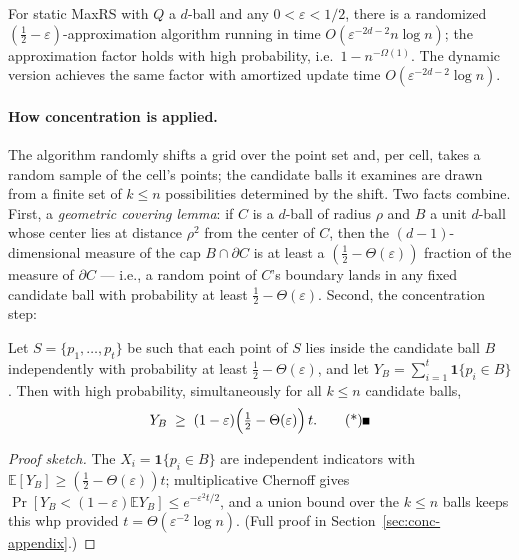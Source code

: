 \begin{theorem}\label{thm:conc-maxrs}
For static MaxRS with $Q$ a $d$-ball and any $0 < \varepsilon < 1/2$, there is a
randomized $(\tfrac12-\varepsilon)$-approximation algorithm running in time
$O(\varepsilon^{-2d-2} n \log n)$; the approximation factor holds with high probability,
i.e.\ $1 - n^{-\Omega(1)}$. The dynamic version achieves the same factor with amortized
update time $O(\varepsilon^{-2d-2}\log n)$. \eop
\end{theorem}

\paragraph{How concentration is applied.}
The algorithm randomly shifts a grid over the point set and, per cell, takes a random
sample of the cell's points; the candidate balls it examines are drawn from a finite set
of $k \le n$ possibilities determined by the shift. Two facts combine. First, a
\emph{geometric covering lemma}: if $C$ is a $d$-ball of radius $\rho$ and $B$ a unit
$d$-ball whose center lies at distance $\rho^2$ from the center of $C$, then the
$(d-1)$-dimensional measure of the cap $B \cap \partial C$ is at least a
$(\tfrac12 - \Theta(\varepsilon))$ fraction of the measure of $\partial C$ --- i.e., a
random point of $C$'s boundary lands in any fixed candidate ball with probability at
least $\tfrac12 - \Theta(\varepsilon)$. Second, the concentration step:

\begin{lemma}
\label{lem:conc-maxrs-sample}
Let $S = \{p_1,\dots,p_t\}$ be such that each point of $S$ lies inside the candidate ball
$B$ independently with probability at least $\tfrac12 - \Theta(\varepsilon)$, and let
$Y_B = \sum_{i=1}^t \mathbf{1}\{p_i \in B\}$. Then with high probability,
simultaneously for all $k \le n$ candidate balls,
\[
Y_B \;\ge\; (1-\varepsilon)\Bigl(\tfrac12 - \Theta(\varepsilon)\Bigr)\,t . \eopm
\]
\end{lemma}

\begin{proof}[Proof sketch]
The $X_i = \mathbf{1}\{p_i \in B\}$ are independent indicators with
$\mathbb{E}[Y_B] \ge (\tfrac12 - \Theta(\varepsilon))t$; multiplicative Chernoff gives
$\Pr[Y_B < (1-\varepsilon)\mathbb{E}Y_B] \le e^{-\varepsilon^2 t/2}$, and a union bound
over the $k \le n$ balls keeps this whp provided
$t = \Theta(\varepsilon^{-2}\log n)$. (Full proof in
Section~\ref{sec:conc-appendix}.)
\end{proof}

